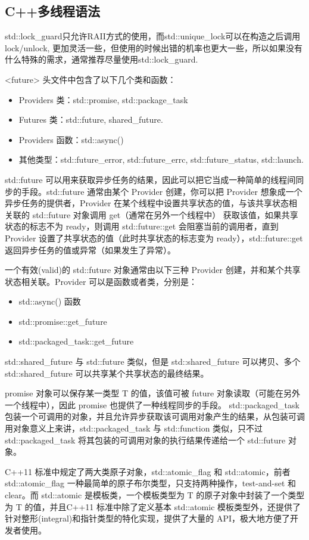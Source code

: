 \subsection{C++多线程语法}


std::lock\_guard只允许RAII方式的使用，而std::unique\_lock可以在构造之后调用lock/unlock, 更加灵活一些，但使用的时候出错的机率也更大一些，所以如果没有什么特殊的需求，通常推荐尽量使用std::lock\_guard.

<future> 头文件中包含了以下几个类和函数：
\begin{itemize}
\item Providers 类：std::promise, std::package\_task
\item Futures 类：std::future, shared\_future.
\item Providers 函数：std::async()
\item 其他类型：std::future\_error, std::future\_errc, std::future\_status, std::launch.
\end{itemize}

std::future 可以用来获取异步任务的结果，因此可以把它当成一种简单的线程间同步的手段。std::future 通常由某个 Provider 创建，你可以把 Provider 想象成一个异步任务的提供者，Provider 在某个线程中设置共享状态的值，与该共享状态相关联的 std::future 对象调用 get（通常在另外一个线程中） 获取该值，如果共享状态的标志不为 ready，则调用 std::future::get 会阻塞当前的调用者，直到 Provider 设置了共享状态的值（此时共享状态的标志变为 ready），std::future::get 返回异步任务的值或异常（如果发生了异常）。

一个有效(valid)的 std::future 对象通常由以下三种 Provider 创建，并和某个共享状态相关联。Provider 可以是函数或者类，分别是：
\begin{itemize}
\item std::async() 函数
\item std::promise::get\_future
\item std::packaged\_task::get\_future
\end{itemize}
std::shared\_future 与 std::future 类似，但是 std::shared\_future 可以拷贝、多个 std::shared\_future 可以共享某个共享状态的最终结果。

promise 对象可以保存某一类型 T 的值，该值可被 future 对象读取（可能在另外一个线程中），因此 promise 也提供了一种线程同步的手段。
std::packaged\_task 包装一个可调用的对象，并且允许异步获取该可调用对象产生的结果，从包装可调用对象意义上来讲，std::packaged\_task 与 std::function 类似，只不过 std::packaged\_task 将其包装的可调用对象的执行结果传递给一个 std::future 对象。

C++11 标准中规定了两大类原子对象，std::atomic\_flag 和 std::atomic，前者 std::atomic\_flag 一种最简单的原子布尔类型，只支持两种操作，test-and-set 和 clear。而 std::atomic 是模板类，一个模板类型为 T 的原子对象中封装了一个类型为 T 的值，并且C++11 标准中除了定义基本 std::atomic 模板类型外，还提供了针对整形(integral)和指针类型的特化实现，提供了大量的 API，极大地方便了开发者使用。








